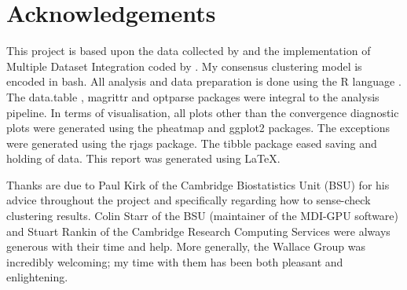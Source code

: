 \documentclass[12pt]{article} %
\begin{document}
	\newpage
	
	\section*{Acknowledgements}
	This project is based upon the data collected by \citet{TheInternationalIBDGeneticsConsortiumIBDriskloci2018} and the implementation of Multiple Dataset Integration coded by \citet{MasonMDIGPUacceleratingintegrative2016a}. My consensus clustering model is encoded in bash. All analysis and data preparation is done using the R language \cite{RCoreTeamLanguageEnvironmentStatistical2018}. The data.table \cite{DowleData.Table2019}, magrittr \cite{BacheMagrittr2014} and optparse \cite{DavisOptparse2019} packages were integral to the analysis pipeline. In terms of visualisation, all plots other than the convergence diagnostic plots were generated using the pheatmap \cite{KoldepheatmapPrettyHeatmaps2018} and ggplot2 \cite{WickhamGgplot22016} packages. The exceptions were generated using the rjags \cite{PlummerRjags2018} package. The tibble \cite{MullerTibble2019} package eased saving and holding of data. This report was generated using \LaTeX.
	
	Thanks are due to Paul Kirk of the Cambridge Biostatistics Unit (BSU) for his advice throughout the project and specifically regarding how to sense-check clustering results. Colin Starr of the BSU (maintainer of the MDI-GPU software) and Stuart Rankin of the Cambridge Research Computing Services were always generous with their time and help. More generally, the Wallace Group was incredibly welcoming; my time with them has been both pleasant and enlightening.
	
	\newpage
	
	\tableofcontents
	
	\newpage
	
\end{document}
